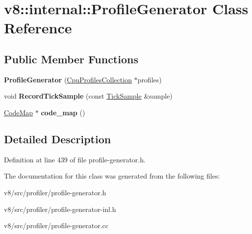 \hypertarget{classv8_1_1internal_1_1ProfileGenerator}{}\section{v8\+:\+:internal\+:\+:Profile\+Generator Class Reference}
\label{classv8_1_1internal_1_1ProfileGenerator}
\subsection*{Public Member Functions}
\begin{DoxyCompactItemize}
\item 
\mbox{\label{classv8_1_1internal_1_1ProfileGenerator_a538d180f766813125ded7ce7d5e69693}} 
{\bfseries Profile\+Generator} (\mbox{\hyperlink{classv8_1_1internal_1_1CpuProfilesCollection}{Cpu\+Profiles\+Collection}} $\ast$profiles)
\item 
\mbox{\label{classv8_1_1internal_1_1ProfileGenerator_a321d0ff6232f550c83d0ffc43da9f599}} 
void {\bfseries Record\+Tick\+Sample} (const \mbox{\hyperlink{structv8_1_1internal_1_1TickSample}{Tick\+Sample}} \&sample)
\item 
\mbox{\label{classv8_1_1internal_1_1ProfileGenerator_a8e7b039f4a0e933edd362264a5c0dd6a}} 
\mbox{\hyperlink{classv8_1_1internal_1_1CodeMap}{Code\+Map}} $\ast$ {\bfseries code\+\_\+map} ()
\end{DoxyCompactItemize}


\subsection{Detailed Description}


Definition at line 439 of file profile-\/generator.\+h.



The documentation for this class was generated from the following files\+:\begin{DoxyCompactItemize}
\item 
v8/src/profiler/profile-\/generator.\+h\item 
v8/src/profiler/profile-\/generator-\/inl.\+h\item 
v8/src/profiler/profile-\/generator.\+cc\end{DoxyCompactItemize}
